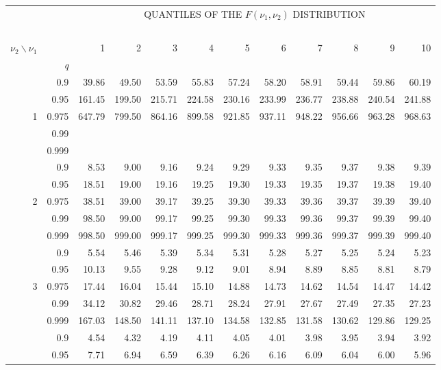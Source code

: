 \documentclass[12pt,a4paper,openany,twoside]{report}
\theoremstyle{definition}
\theoremstyle{remark}
\theoremstyle{plain}
\theoremstyle{definition}
\theoremstyle{definition}
\theoremstyle{definition}
\theoremstyle{remark}
\begin{document}
\begin{center}
\begin{tabular}{rr@{\ }r@{\ }r@{\ }r@{\ }r@{\ }r@{\ }r@{\ }r@{\ }r@{\ }r@{\ }r}
& &\multicolumn{10}{c}{QUANTILES OF THE $F(\nu_1, \nu_2)$ DISTRIBUTION}\\
\ \\
$\nu_2 \backslash  \nu_1$ & & 1 & 2 & 3 & 4 & 5 & 6 & 7 & 8 & 9 & 10\\
 & \textit{q}  &  &  &  &  &  &  &  &  & & \\
\rule{0pt}{2.5ex} & 0.9 & 39.86 & 49.50 & 53.59 & 55.83 & 57.24 & 58.20 & 58.91 & 59.44 & 59.86 & 60.19\\
 & 0.95 & 161.45 & 199.50 & 215.71 & 224.58 & 230.16 & 233.99 & 236.77 & 238.88 & 240.54 & 241.88\\
1 & 0.975 & 647.79 & 799.50 & 864.16 & 899.58 & 921.85 & 937.11 & 948.22 & 956.66 & 963.28 & 968.63\\
 & 0.99 &   &  &   &  &  &  &   &  &  &\\
 & 0.999 &  &  &   &  &  &  &   &  &  &\\
\rule{0pt}{2.5ex} & 0.9 & 8.53 & 9.00 & 9.16 & 9.24 & 9.29 & 9.33 & 9.35 & 9.37 & 9.38 & 9.39\\
 & 0.95 & 18.51 & 19.00 & 19.16 & 19.25 & 19.30 & 19.33 & 19.35 & 19.37 & 19.38 & 19.40\\
2 & 0.975 & 38.51 & 39.00 & 39.17 & 39.25 & 39.30 & 39.33 & 39.36 & 39.37 & 39.39 & 39.40\\
 & 0.99 & 98.50 & 99.00 & 99.17 & 99.25 & 99.30 & 99.33 & 99.36 & 99.37 & 99.39 & 99.40\\
 & 0.999 & 998.50 & 999.00 & 999.17 & 999.25 & 999.30 & 999.33 & 999.36 & 999.37 & 999.39 & 999.40\\
\rule{0pt}{2.5ex} & 0.9 & 5.54 & 5.46 & 5.39 & 5.34 & 5.31 & 5.28 & 5.27 & 5.25 & 5.24 & 5.23\\
 & 0.95 & 10.13 & 9.55 & 9.28 & 9.12 & 9.01 & 8.94 & 8.89 & 8.85 & 8.81 & 8.79\\
3 & 0.975 & 17.44 & 16.04 & 15.44 & 15.10 & 14.88 & 14.73 & 14.62 & 14.54 & 14.47 & 14.42\\
 & 0.99 & 34.12 & 30.82 & 29.46 & 28.71 & 28.24 & 27.91 & 27.67 & 27.49 & 27.35 & 27.23\\
 & 0.999 & 167.03 & 148.50 & 141.11 & 137.10 & 134.58 & 132.85 & 131.58 & 130.62 & 129.86 & 129.25\\
\rule{0pt}{2.5ex} & 0.9 & 4.54 & 4.32 & 4.19 & 4.11 & 4.05 & 4.01 & 3.98 & 3.95 & 3.94 & 3.92\\
 & 0.95 & 7.71 & 6.94 & 6.59 & 6.39 & 6.26 & 6.16 & 6.09 & 6.04 & 6.00 & 5.96\\

\end{tabular}
\end{center}
\end{document}
